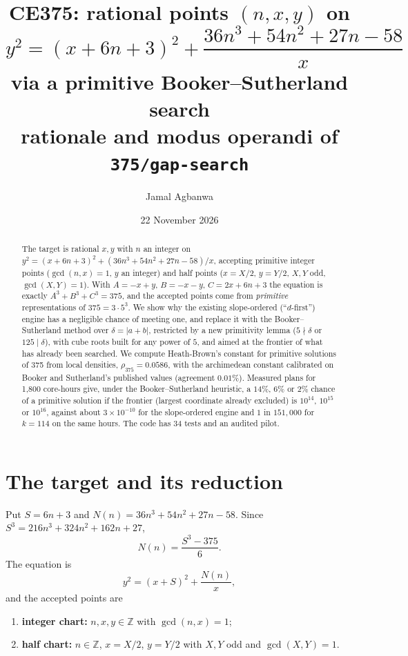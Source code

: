 \documentclass[11pt,a4paper]{article}
\title{CE375: rational points $(n,x,y)$ on $y^2=(x+6n+3)^2+\dfrac{36n^3+54n^2+27n-58}{x}$\\
via a primitive Booker--Sutherland search\\[2pt]
\large rationale and modus operandi of \texttt{375/gap-search}}
\author{Jamal Agbanwa}
\date{22 November 2026}
\theoremstyle{remark}
\begin{document}
\maketitle

\begin{abstract}
The target is rational $x,y$ with $n$ an integer on
$y^2=(x+6n+3)^2+(36n^3+54n^2+27n-58)/x$, accepting primitive integer points ($\gcd(n,x)=1$, $y$
an integer) and half points ($x=X/2$, $y=Y/2$, $X,Y$ odd, $\gcd(X,Y)=1$). With $A=-x+y$,
$B=-x-y$, $C=2x+6n+3$ the equation is exactly $A^3+B^3+C^3=375$, and the accepted points come from
\emph{primitive} representations of $375=3\cdot5^3$. We show why the existing slope-ordered
(``$d$-first'') engine has a negligible chance of meeting one, and replace it with the
Booker--Sutherland method over $\delta=|a+b|$, restricted by a new primitivity lemma
($5\nmid\delta$ or $125\mid\delta$), with cube roots built for any power of $5$, and aimed at the
frontier of what has already been searched. We compute Heath-Brown's constant for primitive
solutions of 375 from local densities, $\rho_{375}=0.0586$, with the archimedean constant
calibrated on Booker and Sutherland's published values (agreement $0.01\%$). Measured plans for
1{,}800 core-hours give, under the Booker--Sutherland heuristic, a $14\%$, $6\%$ or $2\%$ chance of
a primitive solution if the frontier (largest coordinate already excluded) is $10^{14}$,
$10^{15}$ or $10^{16}$, against about $3\times10^{-10}$ for the slope-ordered engine and $1$ in
$151{,}000$ for $k=114$ on the same hours. The code has 34 tests and an audited pilot.
\end{abstract}

\tableofcontents

\section{The target and its reduction}\label{sec:reduction}

Put $S=6n+3$ and $N(n)=36n^3+54n^2+27n-58$. Since $S^3=216n^3+324n^2+162n+27$,
\[
  N(n)=\frac{S^3-375}{6}.
\]
The equation is
\begin{equation}\label{eq:E}
  y^2=(x+S)^2+\frac{N(n)}{x},
\end{equation}
and the accepted points are
\begin{enumerate}[leftmargin=*]
  \item \textbf{integer chart:} $n,x,y\in\mathbb Z$ with $\gcd(n,x)=1$;
  \item \textbf{half chart:} $n\in\mathbb Z$, $x=X/2$, $y=Y/2$ with $X,Y$ odd and $\gcd(X,Y)=1$.
\end{enumerate}
\end{document}
